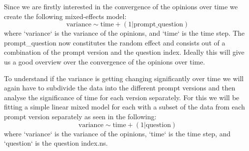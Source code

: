 \documentclass[12pt]{article}
\begin{document}
Since we are firstly interested in the convergence of the opinions over time we create the following mixed-effects model:
\begin{equation}
    \text{variance} \sim \text{time} + (1 | \text{prompt\_question})
\end{equation}
where `variance` is the variance of the opinions, and `time` is the time step. The prompt\_question now constitutes the random effect and consists out of a combination of the prompt version and the question index. Ideally this will give us a good overview over the convergence of the opinions over time. 

To understand if the variance is getting changing significantly over time we will again have to subdivide the data into the different prompt versions and then analyse the significance of time for each version separately. For this we will be fitting a simple linear mixed model for each with a subset of the data from each prompt version separately as seen in the following:
\begin{equation}
    \text{variance} \sim \text{time} + (1 | \text{question})
\end{equation}
where `variance` is the variance of the opinions, `time` is the time step, and `question` is the question index.ns.


\end{document}

